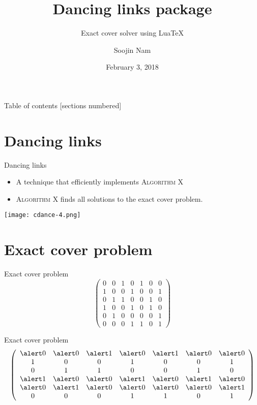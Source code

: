 \documentclass[xcolor=svgnames]{beamer}
\title{Dancing links package}
\subtitle{Exact cover solver using Lua\TeX }
\date{February 3, 2018}
\author{Soojin Nam}
\institute{The Korean \TeX\ Society}
\begin{document}
\maketitle

%
\begin{frame}{Table of contents}
  [sections numbered]
  \tableofcontents
\end{frame}


\section{Dancing links}

%
\begin{frame}{Dancing links}
  \begin{itemize}
  \item A technique that efficiently implements
    \textsc{Algorithm X}
  \item \textsc{Algorithm X} finds all solutions to
    the exact cover problem.
  \end{itemize}
  \centering\texttt{[image: cdance-4.png]}
\end{frame}


\section{Exact cover problem}

%
\begin{frame}{Exact cover problem}
\Large\boldmath
$$
  \left(\begin{array}{ccccccc}
    0&0&1&0&1&0&0\\
    1&0&0&1&0&0&1\\
    0&1&1&0&0&1&0\\
    1&0&0&1&0&1&0\\
    0&1&0&0&0&0&1\\
    0&0&0&1&1&0&1
  \end{array}\right)
  $$
\end{frame}

\let\a\alert
%
\begin{frame}{Exact cover problem}
\Large\boldmath
  $$
  \left(\begin{array}{ccccccc}
    \a0&\a0&\a1&\a0&\a1&\a0&\a0\\
    1&0&0&1&0&0&1\\
    0&1&1&0&0&1&0\\
    \a1&\a0&\a0&\a1&\a0&\a1&\a0\\
    \a0&\a1&\a0&\a0&\a0&\a0&\a1\\
    0&0&0&1&1&0&1
    \end{array}\right)
$$
\end{frame}
\end{document}
